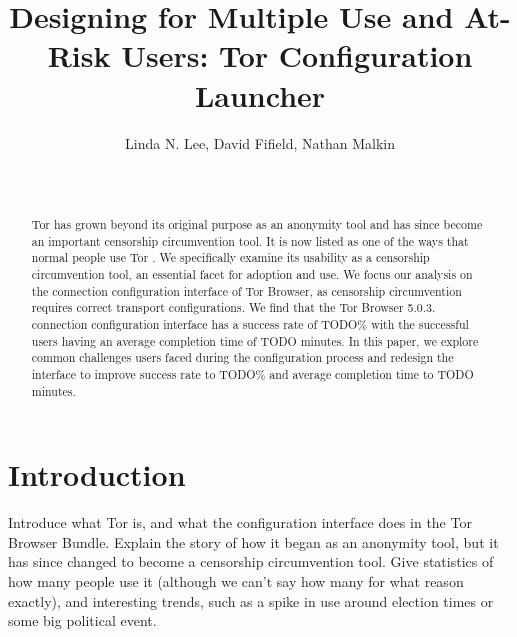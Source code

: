 \documentclass{template}
\begin{document}
\title{Designing for Multiple Use and At-Risk Users: Tor Configuration Launcher}
\author{
 \alignauthor Linda N. Lee, David Fifield, Nathan Malkin \\
   \vspace{0.5em}
    \\
   \\
}
\maketitle

\begin{abstract}
\indent \indent
Tor has grown beyond its original purpose as an anonymity tool and has 
since become an important censorship circumvention tool. It is now listed
as one of the ways that normal people use Tor \cite{whotor}.
We specifically examine its usability as a censorship circumvention tool,
an essential facet for adoption and use. We focus our analysis on the connection 
configuration interface of Tor Browser, as censorship circumvention requires 
correct transport configurations. We find that the Tor Browser 5.0.3. connection
configuration interface has a success rate of {\color {red} TODO}\% with the 
successful users having an average completion time of {\color {red} TODO} minutes. 
In this paper, we explore common challenges users faced during the configuration
process and redesign the interface to improve success rate to {\color {red} TODO}\% 
and average completion time to {\color {red} TODO} minutes.
\end{abstract}


\section{Introduction}
{\color {red} 
Introduce what Tor is, and what the configuration interface does in the Tor Browser Bundle. Explain the story of how it began as an anonymity tool, but it has since changed to become a censorship circumvention tool. Give statistics of how many people use it (although we can't say how many for what reason exactly), and interesting trends, such as a spike in use around election times or some big political event. 
}
\end{document}

